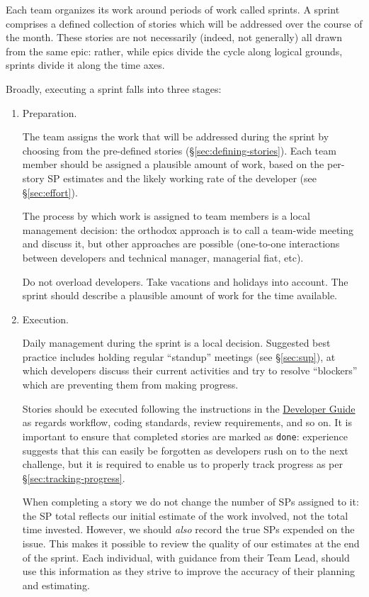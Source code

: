 \begin{itemize}
Each team organizes its work around periods of work called sprints.
A sprint comprises a defined collection of stories which will be addressed over the course of the month.
These stories are not necessarily (indeed, not generally) all drawn from the same \gls{epic}: rather, while \glspl{epic} divide the \gls{cycle} along logical grounds, sprints divide it along the time axes.

Broadly, executing a sprint falls into three stages:

\begin{enumerate}
\item Preparation.

  The team assigns the work that will be addressed during the sprint by choosing from the pre-defined stories (\S\ref{sec:defining-stories}).
  Each team member should be assigned a plausible amount of work, based on the per-\gls{story} \gls{SP} estimates and the likely working rate of the developer (see \S\ref{sec:effort}).

  The process by which work is assigned to team members is a local
  management decision: the orthodox approach is to call a team-wide
  meeting and discuss it, but other approaches are possible (one-to-one
  interactions between developers and technical manager, managerial
  fiat, etc).

  Do not overload developers. Take vacations and holidays into account.
  The sprint should describe a plausible amount of work for the time
  available.
\item Execution.

  Daily management during the sprint is a local decision. Suggested best
  practice includes holding regular ``standup'' meetings (see \S\ref{sec:sup}), at which
  developers discuss their current activities and try to resolve
  ``blockers'' which are preventing them from making progress.

  Stories should be executed following the instructions in the
  \href{http://developer.lsst.io/}{Developer Guide} as regards workflow,
  coding standards, review requirements, and so on. It is important to
  ensure that completed stories are marked as \texttt{done}:
  experience suggests that this can easily be forgotten as developers
  rush on to the next challenge, but it is required to enable us to
  properly track progress as per \S\ref{sec:tracking-progress}.

  When completing a \gls{story} we do not change the number of \glspl{SP} assigned to
  it: the \gls{SP} total reflects our initial estimate of the work involved,
  not the total time invested.
  However, we should \textit{also} record the true \glspl{SP} expended on the issue.
  This makes it possible to review the quality of our estimates at the end of the sprint.
  Each individual, with guidance from their Team Lead, should use this information as they strive to improve the accuracy of their planning and estimating.


\end{enumerate}
\end{itemize}
